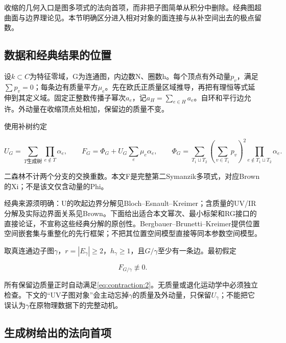 \documentclass[11pt,a4paper,oneside]{ctexart}
\theoremstyle{cnplain}
\theoremstyle{definition}
\theoremstyle{remark}
\numberwithin{equation}{section}
\begin{document}
\begingroup

收缩的几何入口是图多项式的法向首项，而非把子图简单从积分中删除。经典图超曲面与边界理论见\cite{bek,browncosmic,bbr}。本节明确区分进入相对对象的面连接与从补空间出去的极点留数。

\subsection{数据和经典结果的位置}\label{sec:contraction:1}

设\(k\subset C\)为特征零域，G为连通图，内边数N、圈数h。每个顶点有外动量\(p_v\)，满足\(\sum p_v=0\)；每条边有质量平方\(\mu _e\)。先在欧氏正质量区域推导，再把有理恒等式延伸到其定义域。固定正整数传播子幂次\(a_e\)，记\(a_H=\sum _{e\in H}a_e\)。自环和平行边允许。外动量在收缩顶点处相加，保留边的质量不变。

使用补树约定

\begin{equation}
U_G=\sum_{T\text{生成树}}\prod_{e\notin T}\alpha_e,\qquad
 F_G=\Phi_G+U_G\sum_e\mu_e\alpha_e,\qquad
 \Phi_G=\sum_{T_1\sqcup T_2}(\sum_{v\in T_1}p_v)^2
                                  \prod_{e\notin T_1\sqcup T_2}\alpha_e.       \label{eq:contraction:1}
\end{equation}

二森林不计两个分支的交换重数。本文F是完整第二Symanzik多项式，对应Brown的Xi；不是该文仅含动量的Phi。

经典来源须明确：U的吹起边界分解见Bloch--Esnault--Kreimer\cite[Proposition 3.5]{bek}；含质量的UV/IR分解及实际边界面关系见Brown\cite[Proposition 2.2, Theorems 2.7, 6.5, 7.8]{browncosmic}。下面给出适合本文幂次、最小标架和RG接口的直接论证，不宣称这些经典分解的原创性。Bergbauer--Brunetti--Kreimer\cite{bbr}提供位置空间嵌套集与重整化的先行框架；不把其位置空间模型直接等同本参数空间模型。

取真连通边子图\(\gamma \)，\(r=|E_\gamma |\ge 2\)，\(h_\gamma \ge 1\)，且\(G/\gamma \)至少有一条边。最初假定

\begin{equation}
F_{G/\gamma}\not\equiv0.                  \label{eq:contraction:2}
\end{equation}

所有保留边质量正时自动满足\eqref{eq:contraction:2}。无质量或退化运动学中必须独立检查。下文的``UV子图对象''会主动忘掉\(\gamma \)的质量及外动量，只保留\(U_\gamma \)；不能把它误认为\(\gamma \)在原物理数据下的完整动机。


\subsection{生成树给出的法向首项}\label{sec:contraction:2}
\end{document}
